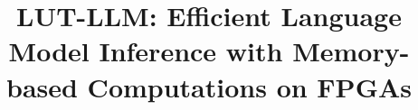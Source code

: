 \documentclass[conference]{IEEEtran}
\begin{document}
%
\title{LUT-LLM: Efficient Language Model Inference with Memory-based Computations on FPGAs}




% 
\end{document}
